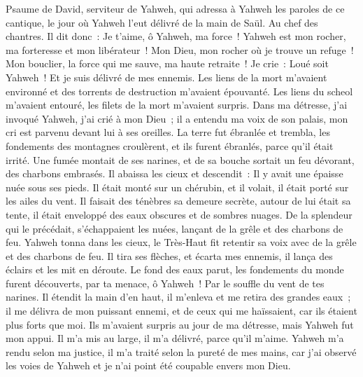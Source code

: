 \begin{multicols}{2}
\VerseOne{}Psaume de David, serviteur de Yahweh, qui adressa à Yahweh les paroles de ce cantique, le jour où Yahweh l'eut délivré de la main de Saül. Au chef des chantres.
Il dit donc~: Je t'aime, ô Yahweh, ma force~!
Yahweh est mon rocher, ma forteresse et mon libérateur~! Mon Dieu, mon rocher où je trouve un refuge~! Mon bouclier, la force qui me sauve, ma haute retraite~!
Je crie~: Loué soit Yahweh~! Et je suis délivré de mes ennemis.
Les liens de la mort m'avaient environné et des torrents de destruction m'avaient épouvanté.
Les liens du scheol m'avaient entouré, les filets de la mort m'avaient surpris.
Dans ma détresse, j'ai invoqué Yahweh, j'ai crié à mon Dieu~; il a entendu ma voix de son palais, mon cri est parvenu devant lui à ses oreilles.
La terre fut ébranlée et trembla, les fondements des montagnes croulèrent, et ils furent ébranlés, parce qu'il était irrité.
Une fumée montait de ses narines, et de sa bouche sortait un feu dévorant, des charbons embrasés.
Il abaissa les cieux et descendit~: Il y avait une épaisse nuée sous ses pieds.
Il était monté sur un chérubin, et il volait, il était porté sur les ailes du vent.
Il faisait des ténèbres sa demeure secrète, autour de lui était sa tente, il était enveloppé des eaux obscures et de sombres nuages.
De la splendeur qui le précédait, s'échappaient les nuées, lançant de la grêle et des charbons de feu.
Yahweh tonna dans les cieux, le Très-Haut fit retentir sa voix avec de la grêle et des charbons de feu.
Il tira ses flèches, et écarta mes ennemis, il lança des éclairs et les mit en déroute.
Le fond des eaux parut, les fondements du monde furent découverts, par ta menace, ô Yahweh~! Par le souffle du vent de tes narines.
Il étendit la main d'en haut, il m'enleva et me retira des grandes eaux~;
il me délivra de mon puissant ennemi, et de ceux qui me haïssaient, car ils étaient plus forts que moi.
Ils m'avaient surpris au jour de ma détresse, mais Yahweh fut mon appui.
Il m'a mis au large, il m'a délivré, parce qu'il m'aime.
Yahweh m'a rendu selon ma justice, il m'a traité selon la pureté de mes mains,
car j'ai observé les voies de Yahweh et je n'ai point été coupable envers mon Dieu.

\end{multicols}
